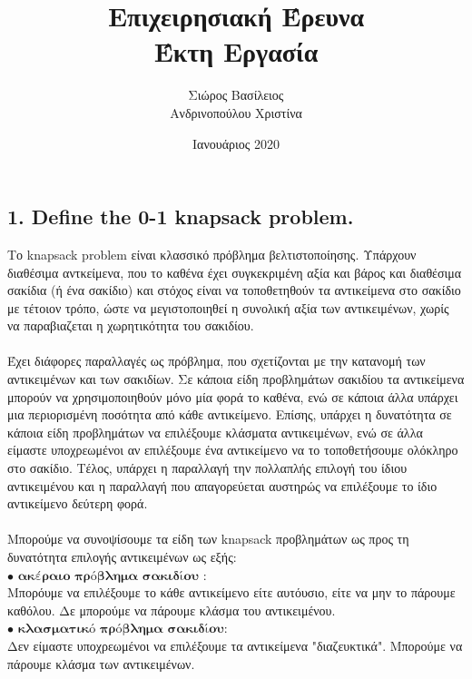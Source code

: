 \documentclass[12pt]{article}
\title{\hugeΑλγοριθμική Επιχειρησιακή Έρευνα\\Έκτη Εργασία}
\author{Σιώρος Βασίλειος\\Ανδρινοπούλου Χριστίνα}
\date{Ιανουάριος 2020}
\begin{document}
\maketitle


\pagebreak


\subsection*{1. Define the 0-1 knapsack problem.}

Το knapsack problem είναι κλασσικό πρόβλημα βελτιστοποίησης. Υπάρχουν διαθέσιμα αντκείμενα, που το καθένα έχει συγκεκριμένη αξία και βάρος και διαθέσιμα σακίδια (ή ένα σακίδιο) και στόχος είναι να τοποθετηθούν τα αντικείμενα στο σακίδιο με τέτοιον τρόπο, ώστε να μεγιστοποιηθεί η συνολική αξία των αντικειμένων, χωρίς να παραβιαζεται η χωρητικότητα του σακιδίου. \\ \\

Έχει διάφορες παραλλαγές ως πρόβλημα, που σχετίζονται με την κατανομή των αντικειμένων και των σακιδίων. Σε κάποια είδη προβλημάτων σακιδίου τα αντικείμενα μπορούν να χρησιμοποιηθούν μόνο μία φορά το καθένα, ενώ σε κάποια άλλα υπάρχει μια περιορισμένη ποσότητα από κάθε αντικείμενο. Επίσης, υπάρχει η δυνατότητα σε κάποια είδη προβλημάτων να επιλέξουμε κλάσματα αντικειμένων, ενώ σε άλλα είμαστε υποχρεωμένοι αν επιλέξουμε ένα αντικείμενο να το τοποθετήσουμε ολόκληρο στο σακίδιο. Τέλος, υπάρχει η παραλλαγή την πολλαπλής επιλογή του ίδιου αντικειμένου και η παραλλαγή που απαγορεύεται αυστηρώς να επιλέξουμε το ίδιο αντικείμενο δεύτερη φορά. \\  \\

Μπορούμε να συνοψίσουμε τα είδη των knapsack προβλημάτων ως προς τη δυνατότητα επιλογής αντικειμένων ως εξής: \\
\(\bullet\) \(\textbf{ακέραιο πρόβλημα σακιδίου}\) : \\
Μπορόυμε να επιλέξουμε το κάθε αντικείμενο είτε αυτόυσιο, είτε να μην το πάρουμε καθόλου. Δε μπορούμε να πάρουμε κλάσμα του αντικειμένου. \\
\(\bullet\) \(\textbf{κλασματικό πρόβλημα σακιδίου}\): \\
Δεν είμαστε υποχρεωμένοι να επιλέξουμε τα αντικείμενα "διαζευκτικά". Μπορούμε να πάρουμε κλάσμα των αντικειμένων. \\
\end{document}
